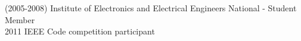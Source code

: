 (2005-2008) Institute of Electronics and Electrical Engineers National - Student Member\\
2011 IEEE Code competition participant\\
